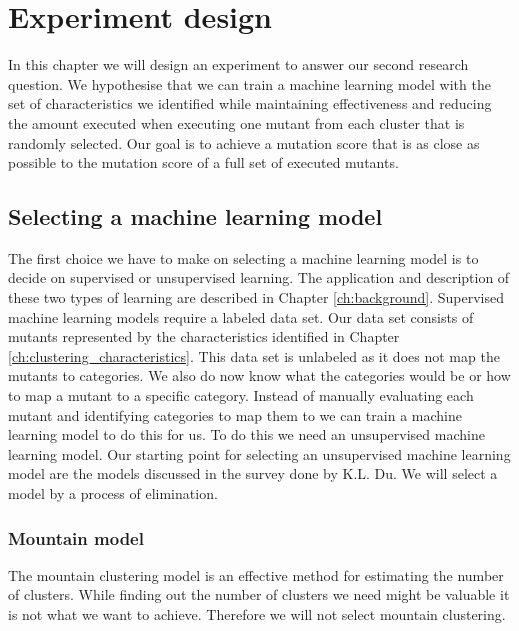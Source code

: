 \documentclass[../../main]{subfiles}
\begin{document}
\clearpage
\section{Experiment design}
In this chapter we will design an experiment to answer our second research question.
We hypothesise that we can train a machine learning model with the set of characteristics we identified
while maintaining effectiveness and reducing the amount executed when executing one mutant from each cluster that is randomly selected.
Our goal is to achieve a mutation score that is as close as possible to the mutation score of a full set of executed mutants.
\newline
{}

\subsection{Selecting a machine learning model}
The first choice we have to make on selecting a machine learning model is to decide on supervised or unsupervised learning.
The application and description of these two types of learning are described in Chapter \ref{ch:background}.
Supervised machine learning models require a labeled data set.
Our data set consists of mutants represented by the characteristics identified in Chapter \ref{ch:clustering_characteristics}.
This data set is unlabeled as it does not map the mutants to categories.
We also do now know what the categories would be or how to map a mutant to a specific category.
Instead of manually evaluating each mutant and identifying categories to map them to we can train a machine learning model to do this for us.
To do this we need an unsupervised machine learning model.
\newline
Our starting point for selecting an unsupervised machine learning model are the models discussed in the survey done by K.L. Du\cite{Du2010Clustering:Approach}.
We will select a model by a process of elimination.

\subsubsection{Mountain model}
The mountain clustering model is an effective method for estimating the number of clusters\cite{Du2010Clustering:Approach}. 
While finding out the number of clusters we need might be valuable it is not what we want to achieve. 
Therefore we will not select mountain clustering.
\end{document}
